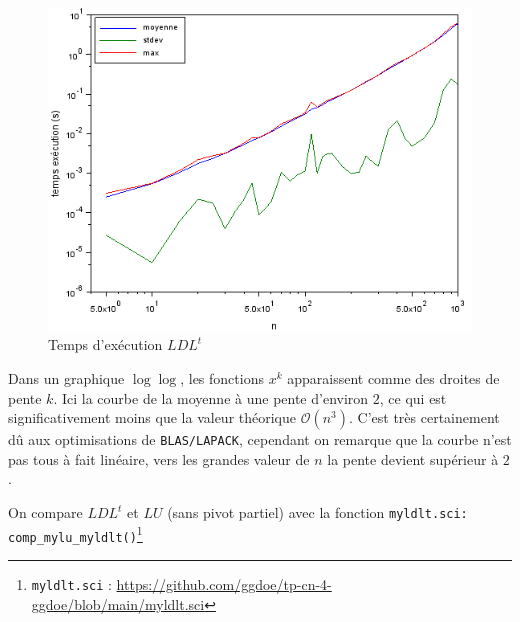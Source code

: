 \documentclass{article}
\begin{document}
\begin{figure}[H]
\caption{Temps d'exécution \(LDL^t\)}
\centering
\includegraphics[scale=0.80]{time_LDLt}
\end{figure}
Dans un graphique \(\log\log\), les fonctions \(x^k\) apparaissent comme des droites de pente \(k\). Ici la courbe de la moyenne à une pente d'environ \(2\), ce qui est significativement moins que la valeur théorique \(\mathcal{O}(n^3)\). C'est très certainement dû aux optimisations de \texttt{BLAS/LAPACK}, cependant on remarque que la courbe n'est pas tous à fait linéaire, vers les grandes valeur de \(n\) la pente devient supérieur à \(2\).

On compare \(LDL^t\) et \(LU\) (sans pivot partiel) avec la fonction \texttt{myldlt.sci: comp\_mylu\_myldlt()}\footnote{\texttt{myldlt.sci} : \href{https://github.com/ggdoe/tp-cn-4-ggdoe/blob/main/myldlt.sci}{https://github.com/ggdoe/tp-cn-4-ggdoe/blob/main/myldlt.sci}}
\end{document}
